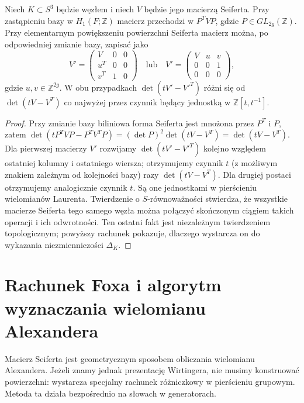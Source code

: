 \begin{stwierdzenie}
Niech $K\subset S^3$ będzie węzłem i niech $V$ będzie
jego macierzą Seiferta. Przy zastąpieniu bazy w
$H_1(F;\mathbb Z)$ macierz przechodzi w $P^TVP$,
gdzie $P\in GL_{2g}(\mathbb Z)$. Przy elementarnym
powiększeniu powierzchni Seiferta macierz można, po
odpowiedniej zmianie bazy, zapisać jako
\[
V'=\begin{pmatrix}V&0&0\\ u^T&0&0\\v^T&1&0\end{pmatrix}
\quad\text{lub}\quad
V'=\begin{pmatrix}V&u&v\\0&0&1\\0&0&0\end{pmatrix},
\]
gdzie $u,v\in\mathbb Z^{2g}$. W obu przypadkach
$\det(tV'-{V'}^T)$ różni się od $\det(tV-V^T)$
co najwyżej przez czynnik będący jednostką w
$\mathbb Z[t,t^{-1}]$.
\end{stwierdzenie}

\begin{proof}
Przy zmianie bazy biliniowa forma Seiferta jest mnożona
przez $P^T$ i $P$, zatem
$\det(tP^TVP-P^TV^TP)=(\det P)^2\det(tV-V^T)
=\det(tV-V^T)$. Dla pierwszej macierzy $V'$ rozwijamy
$\det(tV'-{V'}^T)$ kolejno względem ostatniej kolumny
i ostatniego wiersza; otrzymujemy czynnik $t$ (z
możliwym znakiem zależnym od kolejności bazy) razy
$\det(tV-V^T)$. Dla drugiej postaci otrzymujemy
analogicznie czynnik $t$. Są one jednostkami w pierścieniu
wielomianów Laurenta.
Twierdzenie o $S$-równoważności stwierdza, że wszystkie macierze
Seiferta tego samego węzła można połączyć skończonym
ciągiem takich operacji i ich odwrotności. Ten ostatni
fakt jest niezależnym twierdzeniem topologicznym; powyższy
rachunek pokazuje, dlaczego wystarcza on do wykazania
niezmienniczości $\Delta_K$.
\end{proof}

\section{Rachunek Foxa i algorytm wyznaczania wielomianu Alexandera}
\label{sec:kt-fox-calculus}

Macierz Seiferta jest geometrycznym sposobem obliczania
wielomianu Alexandera. Jeżeli znamy jednak prezentację
Wirtingera, nie musimy konstruować powierzchni: wystarcza
specjalny rachunek różniczkowy w pierścieniu grupowym.
Metoda ta działa bezpośrednio na słowach w generatorach.

